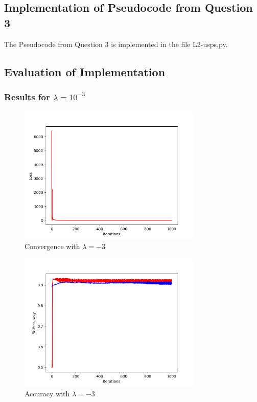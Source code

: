 \documentclass[letterpaper,10pt]{article}
\begin{document}
\subsection{Implementation of Pseudocode from Question 3}
The Pseudocode from Question 3 is implemented in the file L2-usps.py.

\subsection{Evaluation of Implementation}
\subsubsection{Results for \(\lambda = 10^{-3}\)}
     \begin{figure}[ht]
    \centering
   \includegraphics[width=250pt]{L2-neg3-convergence.png}
    \caption{Convergence with \(\lambda = -3\)}
    \label{fig:Convergence of loss function over iterations}
    \end{figure}

     \begin{figure}[ht]
    \centering
   \includegraphics[width=250pt]{L2-neg3-gradientLong.png}
     \caption{Accuracy with \(\lambda = -3\)}
    \label{fig:Plot of accuracy over iterations. Red is training data.}
    \end{figure}
\end{document}
